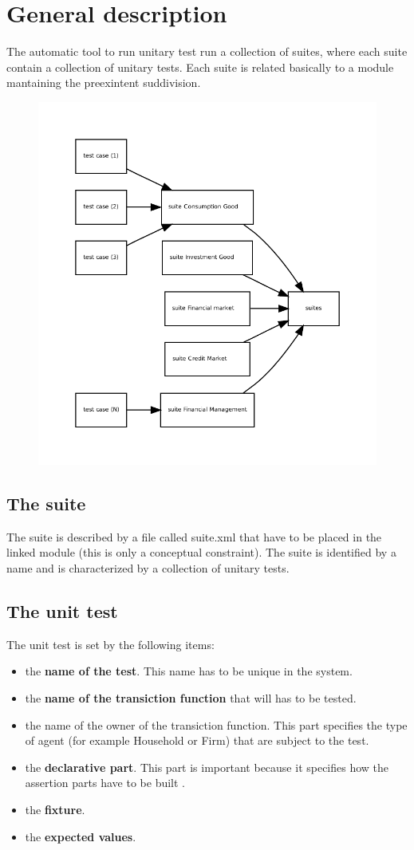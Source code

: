 \documentclass[a4paper,10pt]{article}
\begin{document}
\section{General description}
The automatic tool to run unitary test run a collection of suites, 
where each suite contain a collection of unitary tests. 
Each suite is related basically to a module mantaining the preexintent suddivision.
\begin{figure}
\centering
\includegraphics[scale=0.9]{graph/suites} 
\end{figure}

\subsection{The suite}
The suite is described by a file called suite.xml that have to be placed in the linked module (this is only a conceptual constraint). The suite is identified by a name and is characterized by a collection of unitary tests.
\subsection{The unit test}
The  unit test is set by the following items:
\begin{itemize}
\item the \textbf{name of the test}. This name has to be unique in the  system.
\item the \textbf{name of the transiction function} that will has to be tested.
\item the name of the owner of the transiction function. This part specifies the type of agent (for example Household or Firm) that are subject to the test.
\item the \textbf{declarative part}. This part is important because it specifies how the assertion parts have to be built .
\item the \textbf{fixture}. 
\item the \textbf{expected values}.
\end{itemize}
\end{document}
